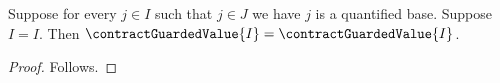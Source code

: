 

\begin{proposition}\label{whole_contract_extra_guard}
    Suppose for every $j\in I$ such that $j\in J$ we have $j$ is a quantified base.
    Suppose $I=I$.
    Then $\contractGuardedValue{I}=\contractGuardedValue{I}$.
\end{proposition}
\begin{proof}
    Follows.
\end{proof}
